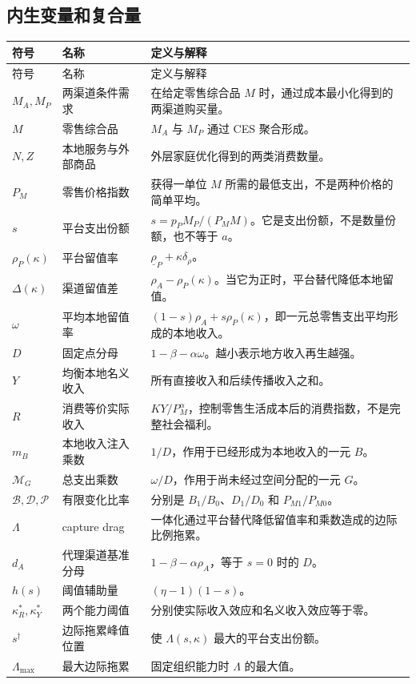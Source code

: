 \documentclass[UTF8,11pt,scheme=chinese,fontset=fandol]{ctexart}
\newcommand{\calB}{\mathcal B}
\newcommand{\calD}{\mathcal D}
\newcommand{\calP}{\mathcal P}
\theoremstyle{definition}
\begin{document}
\subsection{内生变量和复合量}

\small
\begin{longtable}{>{\centering\arraybackslash}p{1.8cm}
>{\raggedright\arraybackslash}p{3.0cm}
>{\raggedright\arraybackslash}p{10.0cm}}
\toprule
符号 & 名称 & 定义与解释 \\
\midrule
\endfirsthead
\toprule
符号 & 名称 & 定义与解释 \\
\midrule
\endhead
\(M_A,M_P\) & 两渠道条件需求 & 在给定零售综合品 \(M\) 时，通过成本最小化得到的两渠道购买量。\\
\(M\) & 零售综合品 & \(M_A\) 与 \(M_P\) 通过 CES 聚合形成。\\
\(N,Z\) & 本地服务与外部商品 & 外层家庭优化得到的两类消费数量。\\
\(P_M\) & 零售价格指数 & 获得一单位 \(M\) 所需的最低支出，不是两种价格的简单平均。\\
\(s\) & 平台支出份额 & \(s=p_PM_P/(P_MM)\)。它是支出份额，不是数量份额，也不等于 \(a\)。\\
\(\rho_P(\kappa)\) & 平台留值率 & \(\underline\rho_P+\kappa\delta_\rho\)。\\
\(\Delta(\kappa)\) & 渠道留值差 & \(\rho_A-\rho_P(\kappa)\)。当它为正时，平台替代降低本地留值。\\
\(\omega\) & 平均本地留值率 & \((1-s)\rho_A+s\rho_P(\kappa)\)，即一元总零售支出平均形成的本地收入。\\
\(D\) & 固定点分母 & \(1-\beta-\alpha\omega\)。越小表示地方收入再生越强。\\
\(Y\) & 均衡本地名义收入 & 所有直接收入和后续传播收入之和。\\
\(R\) & 消费等价实际收入 & \(K Y/P_M^\alpha\)，控制零售生活成本后的消费指数，不是完整社会福利。\\
\(m_B\) & 本地收入注入乘数 & \(1/D\)，作用于已经形成为本地收入的一元 \(B\)。\\
\(\mathcal M_G\) & 总支出乘数 & \(\omega/D\)，作用于尚未经过空间分配的一元 \(G\)。\\
\(\calB,\calD,\calP\) & 有限变化比率 & 分别是 \(B_1/B_0\)、\(D_1/D_0\) 和 \(P_{M1}/P_{M0}\)。\\
\(\Lambda\) & capture drag & 一体化通过平台替代降低留值率和乘数造成的边际比例拖累。\\
\(d_A\) & 代理渠道基准分母 & \(1-\beta-\alpha\rho_A\)，等于 \(s=0\) 时的 \(D\)。\\
\(h(s)\) & 阈值辅助量 & \((\eta-1)(1-s)\)。\\
\(\kappa_R^*,\kappa_Y^*\) & 两个能力阈值 & 分别使实际收入效应和名义收入效应等于零。\\
\(s^\dagger\) & 边际拖累峰值位置 & 使 \(\Lambda(s,\kappa)\) 最大的平台支出份额。\\
\(\Lambda_{\max}\) & 最大边际拖累 & 固定组织能力时 \(\Lambda\) 的最大值。\\
\bottomrule
\end{longtable}
\normalsize
\end{document}
